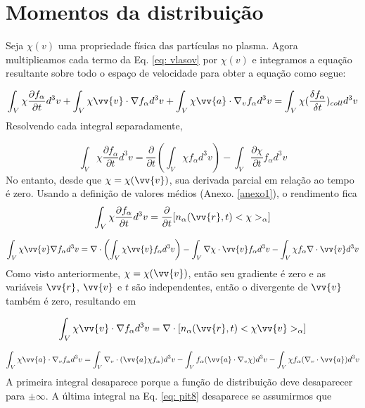 \documentclass[12pt,oneside,a4paper]{abntex2}
\theoremstyle{definition}  %
\begin{document}
\chapter{Momentos da distribuição}
 Seja $\chi(v)$ uma propriedade física das partículas no plasma. Agora multiplicamos cada termo da Eq. \ref{eq: vlasov} por $\chi(v)$ e integramos a equação resultante sobre todo o espaço de velocidade para obter a equação como segue:

\begin{equation}
\label{eq: pit3}
\int_V \chi \frac{\partial f_\alpha}{\partial t} d^3 v + \int_V \chi \vv{v} \cdot \nabla f_\alpha d^3 v + \int_V \chi \vv{a} \cdot \nabla_v f_\alpha d^3 v = \int_V \chi (\frac{\delta f_\alpha}{\delta t})_{coll} d^3 v
\end{equation}
Resolvendo cada integral separadamente,

\begin{equation}
\label{eq: pit4}
\int_V \chi \frac{\partial f_\alpha}{\partial t} d^3 v  = \frac{\partial }{\partial t} (\int_V \chi f_\alpha d^3 v)-\int_V \frac{\partial \chi}{\partial t} f_\alpha d^3 v
\end{equation}
No entanto, desde que $\chi = \chi(\vv{v})$, sua derivada parcial em relação ao tempo é zero. Usando a definição de valores médios (Anexo. \ref{anexo1}), o rendimento fica
\begin{equation}
\label{eq: pit5}
\int_V \chi \frac{\partial f_\alpha}{\partial t} d^3 v = \frac{\partial}{\partial t} [n_\alpha(\vv{r},t)<\chi>_\alpha]
\end{equation}

\begin{equation}
\label{eq: pit6}
\int_V \chi \vv{v} \nabla f_\alpha d^3 v = \nabla \cdot \left( \int_V \chi \vv{v} f_\alpha d^3 v \right) - \int_V \nabla \chi \cdot \vv{v} f_\alpha d^3 v - \int_V \chi  f_\alpha \nabla \cdot \vv{v}  d^3 v
\end{equation}
Como visto anteriormente, $\chi = \chi(\vv{v})$, então seu gradiente é zero e as variáveis $\vv{r}$, $\vv{v}$ e $t$ são independentes, então o divergente de $\vv{v}$ também é zero, resultando em

\begin{equation}
\label{eq: pit7}
\int_V \chi \vv{v} \cdot \nabla f_\alpha d^3 v = \nabla \cdot [n_\alpha(\vv{r},t)<\chi \vv{v}>_\alpha]
\end{equation}

\begin{equation}
\label{eq: pit8}
\int_V \chi \vv{a} \cdot \nabla_v f_\alpha d^3 v = \int_V \nabla_v \cdot (\vv{a} \chi f_\alpha)d^3 v - \int_V f_\alpha (\vv{a} \cdot \nabla_v \chi) d^3 v - \int_V \chi  f_\alpha (\nabla_v \cdot \vv{a})  d^3 v
\end{equation}
A primeira integral desaparece porque a função de distribuição deve desaparecer para $\pm \infty$. A última integral na Eq. \ref{eq: pit8} desaparece se assumirmos que
\end{document}
